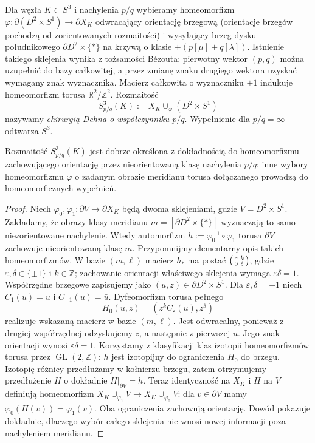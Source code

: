 \begin{definicja}
Dla węzła $K\subset S^3$ i nachylenia $p/q$ wybieramy
homeomorfizm $\varphi\colon\partial(D^2\times S^1)
\to\partial X_K$ odwracający orientację brzegową
(orientacje brzegów pochodzą od zorientowanych
rozmaitości) i wysyłający brzeg dysku południkowego
$\partial D^2\times\{*\}$ na krzywą o klasie
$\pm(p[\mu]+q[\lambda])$. Istnienie takiego
sklejenia wynika z tożsamości Bézouta: pierwotny
wektor $(p,q)$ można uzupełnić do bazy całkowitej,
a przez zmianę znaku drugiego wektora uzyskać
wymagany znak wyznacznika. Macierz całkowita
o wyznaczniku $\pm1$ indukuje homeomorfizm
torusa $\mathbb R^2/\mathbb Z^2$. Rozmaitość
\[
S^3_{p/q}(K):=X_K\cup_\varphi(D^2\times S^1)
\]
nazywamy \emph{chirurgią Dehna o współczynniku $p/q$}.
Wypełnienie dla $p/q=\infty$ odtwarza $S^3$.
\end{definicja}

\begin{stwierdzenie}
Rozmaitość $S^3_{p/q}(K)$ jest dobrze określona z dokładnością
do homeomorfizmu zachowującego orientację przez nieorientowaną
klasę nachylenia $p/q$; inne wybory homeomorfizmu
$\varphi$ o zadanym obrazie meridianu torusa dołączanego
prowadzą do homeomorficznych wypełnień.
\end{stwierdzenie}

\begin{proof}
Niech $\varphi_0,\varphi_1:\partial V\to\partial X_K$
będą dwoma sklejeniami, gdzie $V=D^2\times S^1$.
Zakładamy, że obrazy klasy meridianu $m=[\partial D^2\times\{*\}]$
wyznaczają to samo niezorientowane nachylenie. Wtedy
automorfizm $h:=\varphi_0^{-1}\circ\varphi_1$ torusa
$\partial V$ zachowuje nieorientowaną klasę $m$.
Przypomnijmy elementarny opis takich homeomorfizmów.
W bazie $(m,\ell)$ macierz $h_*$ ma postać
$\begin{psmallmatrix}\varepsilon & k\\ 0 & \delta\end{psmallmatrix}$,
gdzie $\varepsilon,\delta\in\{\pm1\}$ i $k\in\mathbb Z$;
zachowanie orientacji właściwego sklejenia wymaga
$\varepsilon\delta=1$. Współrzędne brzegowe zapisujemy jako $(u,z)\in
\partial D^2\times S^1$. Dla $\varepsilon,\delta=\pm1$
niech $C_1(u)=u$ i $C_{-1}(u)=\bar u$.
Dyfeomorfizm torusa pełnego
\[
H_0(u,z)=(z^k C_\varepsilon(u),z^\delta)
\]
realizuje wskazaną macierz w bazie $(m,\ell)$.
Jest odwracalny, ponieważ z drugiej współrzędnej
odzyskujemy $z$, a następnie z pierwszej $u$.
Jego znak orientacji wynosi $\varepsilon\delta=1$.
Korzystamy z klasyfikacji klas izotopii
homeomorfizmów torusa przez $\operatorname{GL}(2,\mathbb Z)$:
$h$ jest izotopijny do ograniczenia $H_0$ do brzegu.
Izotopię różnicy przedłużamy w kołnierzu brzegu,
zatem otrzymujemy przedłużenie $H$ o dokładnie
$H|_{\partial V}=h$.
Teraz identyczność na $X_K$ i $H$ na $V$ definiują
homeomorfizm $X_K\cup_{\varphi_1}V\to
X_K\cup_{\varphi_0}V$: dla $v\in\partial V$
mamy $\varphi_0(H(v))=\varphi_1(v)$.
Oba ograniczenia zachowują orientację.
Dowód pokazuje dokładnie, dlaczego wybór całego sklejenia
nie wnosi nowej informacji poza nachyleniem meridianu.
\end{proof}


